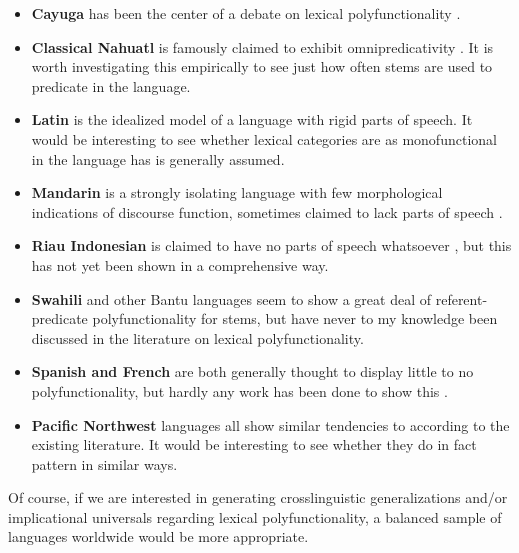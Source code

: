\begin{itemize}

  \singlespacing

  \item \textbf{Cayuga} has been the center of a debate on lexical polyfunctionality \parencites{Sasse1988}{Sasse1993}{Mithun2000}.

  \item \textbf{Classical Nahuatl} is famously claimed to exhibit omnipredicativity \parencites{Launey1994}{Launey2004}. It is worth investigating this empirically to see just how often stems are used to predicate in the language.

  \item \textbf{Latin} is the idealized model of a language with rigid parts of speech. It would be interesting to see whether lexical categories are as monofunctional in the language has is generally assumed.

  \item \textbf{Mandarin} is a strongly isolating language with few morphological indications of discourse function, sometimes claimed to lack parts of speech \parencites{McDonald2013}{Sun2020}.

  \item \textbf{Riau Indonesian} is claimed to have no parts of speech whatsoever \parencite{Gil1994}, but this has not yet been shown in a comprehensive way.

  \item \textbf{Swahili} and other Bantu languages seem to show a great deal of referent-predicate polyfunctionality for stems, but have never to my knowledge been discussed in the literature on lexical polyfunctionality.

  \item \textbf{Spanish and French} are both generally thought to display little to no polyfunctionality, but hardly any work has been done to show this .

  \item \textbf{Pacific Northwest} languages all show similar tendencies to  according to the existing literature. It would be interesting to see whether they do in fact pattern in similar ways.

\end{itemize}

\noindent Of course, if we are interested in generating crosslinguistic generalizations and/or implicational universals regarding lexical polyfunctionality, a balanced sample of languages worldwide would be more appropriate.

